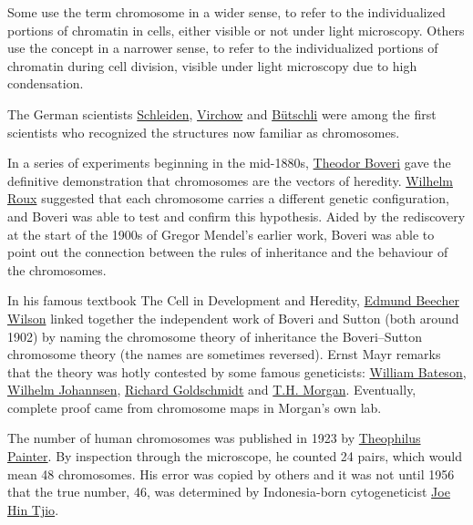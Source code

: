 Some use the term chromosome in a wider sense, to refer to the individualized portions of chromatin in cells, either visible or not under light microscopy. Others use the concept in a narrower sense, to refer to the individualized portions of chromatin during cell division, visible under light microscopy due to high condensation.

The German scientists \href{https://en.wikipedia.org/wiki/Matthias_Jakob_Schleiden}{Schleiden}, \href{https://en.wikipedia.org/wiki/Rudolf_Virchow}{Virchow} and \href{https://en.wikipedia.org/wiki/Otto_Bütschli}{Bütschli} were among the first scientists who recognized the structures now familiar as chromosomes.

In a series of experiments beginning in the mid-1880s, \href{https://en.wikipedia.org/wiki/Theodor_Boveri}{Theodor Boveri} gave the definitive demonstration that chromosomes are the vectors of heredity. \href{https://en.wikipedia.org/wiki/Wilhelm_Roux}{Wilhelm Roux} suggested that each chromosome carries a different genetic configuration, and Boveri was able to test and confirm this hypothesis. Aided by the rediscovery at the start of the 1900s of Gregor Mendel's earlier work, Boveri was able to point out the connection between the rules of inheritance and the behaviour of the chromosomes.

In his famous textbook The Cell in Development and Heredity, \href{https://en.wikipedia.org/wiki/Edmund_Beecher_Wilson}{Edmund Beecher Wilson} linked together the independent work of Boveri and Sutton (both around 1902) by naming the chromosome theory of inheritance the Boveri--Sutton chromosome theory (the names are sometimes reversed). Ernst Mayr remarks that the theory was hotly contested by some famous geneticists: \href{https://en.wikipedia.org/wiki/William_Bateson}{William Bateson}, \href{https://en.wikipedia.org/wiki/Wilhelm_Johannsen}{Wilhelm Johannsen}, \href{https://en.wikipedia.org/wiki/Richard_Goldschmidt}{Richard Goldschmidt} and \href{https://en.wikipedia.org/wiki/Thomas_Hunt_Morgan}{T.H. Morgan}. Eventually, complete proof came from chromosome maps in Morgan's own lab.

The number of human chromosomes was published in 1923 by \href{https://en.wikipedia.org/wiki/Theophilus_Painter}{Theophilus Painter}. By inspection through the microscope, he counted 24 pairs, which would mean 48 chromosomes. His error was copied by others and it was not until 1956 that the true number, 46, was determined by Indonesia-born cytogeneticist \href{https://en.wikipedia.org/wiki/Joe_Hin_Tjio}{Joe Hin Tjio}.

